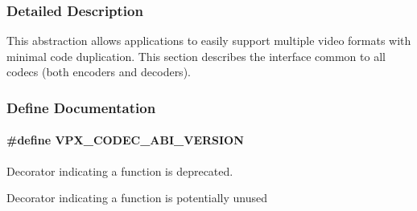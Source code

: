 \subsubsection{\-Detailed \-Description}
\-This abstraction allows applications to easily support multiple video formats with minimal code duplication. \-This section describes the interface common to all codecs (both encoders and decoders). 

\subsubsection{\-Define \-Documentation}
\hypertarget{group__codec_gaf7e9cad2df0f81679b881f46740ad097}{
\paragraph[{\-V\-P\-X\-\_\-\-C\-O\-D\-E\-C\-\_\-\-A\-B\-I\-\_\-\-V\-E\-R\-S\-I\-O\-N}]{\setlength{\rightskip}{0pt plus 5cm}\#define {\bf \-V\-P\-X\-\_\-\-C\-O\-D\-E\-C\-\_\-\-A\-B\-I\-\_\-\-V\-E\-R\-S\-I\-O\-N}}}\label{group__codec_gaf7e9cad2df0f81679b881f46740ad097}


\-Decorator indicating a function is deprecated. 

\-Decorator indicating a function is potentially unused

